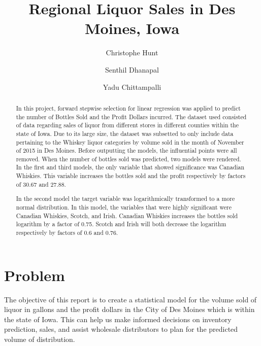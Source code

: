 \documentclass[]{elsarticle} %
\begin{document}
\begin{frontmatter}

  \title{Regional Liquor Sales in Des Moines, Iowa}
    \author[CUNY School of Professional Studies]{Christophe Hunt}
    \author[CUNY School of Professional Studies]{Senthil Dhanapal}
  
    \author[CUNY School of Professional Studies]{Yadu Chittampalli}
  
      \address[CUNY School of Professional Studies]{CUNY School of Professional Studies, Data Analytics, New York, NY}
  
  \begin{abstract}
  In this project, forward stepwise selection for linear regression was
  applied to predict the number of Bottles Sold and the Profit Dollars
  incurred. The dataset used consisted of data regarding sales of liquor
  from different stores in different counties within the state of Iowa.
  Due to its large size, the dataset was subsetted to only include data
  pertaining to the Whiskey liquor categories by volume sold in the month
  of November of 2015 in Des Moines. Before outputting the models, the
  influential points were all removed. When the number of bottles sold was
  predicted, two models were rendered. In the first and third models, the
  only variable that showed significance was Canadian Whiskies. This
  variable increases the bottles sold and the profit respectively by
  factors of 30.67 and 27.88.
  
  In the second model the target variable was logarithmically transformed
  to a more normal distribution. In this model, the variables that were
  highly significant were Canadian Whiskies, Scotch, and Irish. Canadian
  Whiskies increases the bottles sold logarithm by a factor of 0.75.
  Scotch and Irish will both decrease the logarithm respectively by
  factors of 0.6 and 0.76.
  \end{abstract}
  
 \end{frontmatter}

\section{Problem}\label{problem}

The objective of this report is to create a statistical model for the
volume sold of liquor in gallons and the profit dollars in the City of
Des Moines which is within the state of Iowa. This can help us make
informed decisions on inventory prediction, sales, and assist wholesale
distributors to plan for the predicted volume of distribution.
\end{document}
